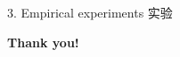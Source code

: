 \documentclass[CJKutf8]{beamer}
\begin{document}
\begin{CJK*}{UTF8}{gbsn}
\begin{frame}{3. Empirical experiments 实验}
  \end{frame} %

  \begin{frame}{}
    \begin{center}
      \Huge{\bf{Thank you!}}
    \end{center}
  \end{frame} %


\end{CJK*}
\end{document}

